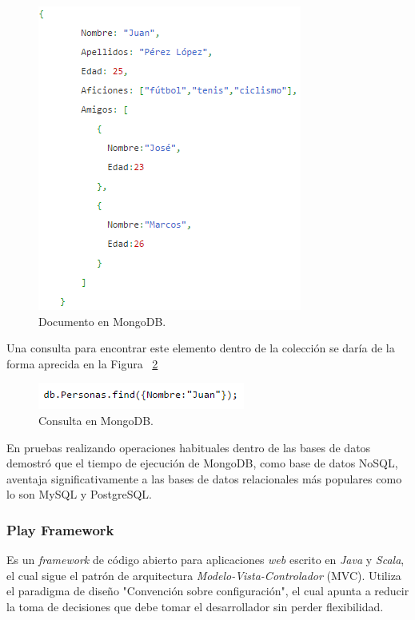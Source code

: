 \begin{figure}[H]
	\centering
	\captionsetup{justification=centering}
	\includegraphics[scale=0.8]{images/MongoJsonExample.png}
	\caption[Documento en MongoDB.]{Documento en MongoDB.}
	\label{fig:MongoJsonExample}
\end{figure}

Una consulta para encontrar este elemento dentro de la colección se daría de la forma aprecida en la Figura ~\ref{fig:MongoJsonQueryExample}

\begin{figure}[H]
	\centering
	\captionsetup{justification=centering}
	\includegraphics[scale=0.8]{images/MongoJsonQueryExample.png}
	\caption[Consulta en MongoDB.]{Consulta en MongoDB.}
	\label{fig:MongoJsonQueryExample}
\end{figure}

En pruebas realizando operaciones habituales dentro de las bases de datos \cite{MongoPerformance} demostró que el tiempo de ejecución de MongoDB, como base de datos NoSQL, aventaja significativamente a las bases de datos relacionales más populares como lo son MySQL y PostgreSQL.

\subsubsection{Play Framework}
\label{subsubsec:playframework}

Es un \textit{framework} de código abierto para aplicaciones \textit{web} escrito en \textit{Java} y \textit{Scala}, el cual sigue el patrón de arquitectura \textit{Modelo-Vista-Controlador} (MVC). Utiliza el paradigma de diseño "Convención sobre configuración", el cual apunta a reducir la toma de decisiones que debe tomar el desarrollador sin perder flexibilidad. 

